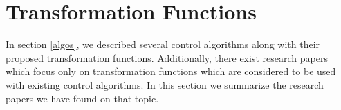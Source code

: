 \documentclass[11pt,a4paper]{article}
\begin{document}
\newpage



\newpage

\section{Transformation Functions}
In section \ref{algos}, we described several control algorithms along with their proposed transformation functions. Additionally, there exist research papers which focus only on transformation functions which are considered to be used with existing control algorithms. In this section we summarize the research papers we have found on that topic.





\newpage



\newpage

\end{document}
